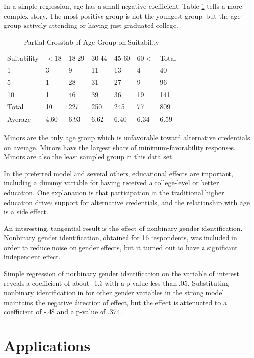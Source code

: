 \documentclass[AER]{./aea-latex-templates/AEA}
\begin{document}
In a simple regression, age has a small negative coefficient.
Table \ref{tab:partial_crosstab_voi_agegroup} tells a more complex story.
The most positive group is not the youngest group, but the age group actively
attending or having just graduated college.

\begin{table}
    \caption{Partial Crosstab of Age Group on Suitability}
    \begin{tabular}{lllllll}
        Suitability & $<$18 & 18-29 & 30-44 & 45-60 & 60$<$ & Total \\
        1 & 3 & 9 & 11 & 13 & 4 & 40 \\
        5 & 1 & 28 & 31 & 27 & 9 & 96 \\
        10 & 1 & 46 & 39 & 36 & 19 & 141 \\
        Total & 10 & 227 & 250 & 245 & 77 & 809 \\
        Average & 4.60 & 6.93 & 6.62 & 6.40 & 6.34 & 6.59 %
    \end{tabular}
    \label{tab:partial_crosstab_voi_agegroup}
    \end{table}

Minors are the only age group which is unfavorable toward alternative credentials on average.
Minors have the largest share of minimum-favorability responses.
Minors are also the least sampled group in this data set.

In the preferred model and several others, educational effects are important, including a
dummy variable for having received a college-level or better education.
One explanation is that participation in the traditional higher education
drives support for alternative credentials, and the relationship with age is a
side effect.

An interesting, tangential result is the effect of nonbinary gender identification.
Nonbinary gender identification, obtained for 16 respondents, was included in order to
reduce noise on gender effects, but it turned out to have a significant independent effect.

Simple regression of nonbinary gender identification on the variable of
interest reveals a coefficient of about -1.3 with a p-value less than .05.
Substituting nonbinary identification in for other gender variables in the strong model
maintains the negative direction of effect, but the effect is
attenuated to a coefficient of -.48 and a p-value of .374.

\section{Applications}
\end{document}
